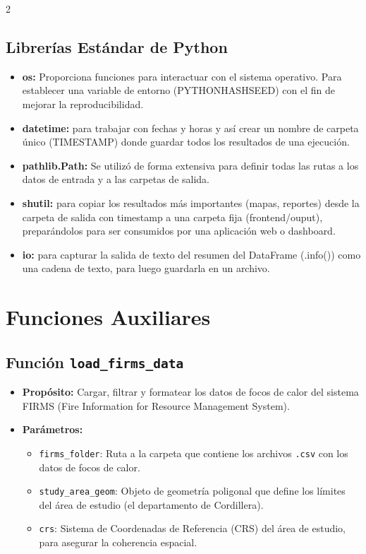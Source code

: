 \documentclass[a4paper,10pt]{article}
\begin{document}
\begin{multicols}{2}
\subsection{Librerías Estándar de Python}
\begin{itemize}
    \item \textbf{os:} Proporciona funciones para interactuar con el sistema operativo. Para establecer una variable de entorno (PYTHONHASHSEED) con el fin de mejorar la reproducibilidad.
    \item \textbf{datetime:}  para trabajar con fechas y horas  y así crear un nombre de carpeta único (TIMESTAMP) donde guardar todos los resultados de una ejecución.
    \item \textbf{pathlib.Path:} Se utilizó de forma extensiva para definir todas las rutas a los datos de entrada y a las carpetas de salida.
    \item \textbf{shutil:} para copiar los resultados más importantes (mapas, reportes) desde la carpeta de salida con timestamp a una carpeta fija (frontend/ouput), preparándolos para ser consumidos por una aplicación web o dashboard.
    \item \textbf{io:} para capturar la salida de texto del resumen del DataFrame (.info()) como una cadena de texto, para luego guardarla en un archivo.
\end{itemize}


\section{Funciones Auxiliares}
\subsection{Función \texttt{load\_firms\_data}}

\begin{itemize}
    \item \textbf{Propósito:} Cargar, filtrar y formatear los datos de focos de calor del sistema FIRMS (Fire Information for Resource Management System).

    \item \textbf{Parámetros:}
    \begin{itemize}
        \item \texttt{firms\_folder}: Ruta a la carpeta que contiene los archivos \texttt{.csv} con los datos de focos de calor.
        \item \texttt{study\_area\_geom}: Objeto de geometría poligonal que define los límites del área de estudio (el departamento de Cordillera).
        \item \texttt{crs}: Sistema de Coordenadas de Referencia (CRS) del área de estudio, para asegurar la coherencia espacial.
    \end{itemize}


\end{itemize}
\end{multicols}
\end{document}
